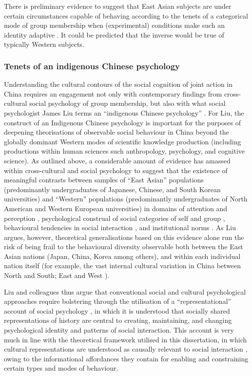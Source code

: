 \begin{CJK}{UTF8}{gbsn}
There is preliminary evidence to suggest that East Asian subjects are under certain circumstances capable of behaving according to the tenets of a categorical mode of group membership when (experimental) conditions make such an identity adaptive \citep{Hong2000}.  It could be predicted that the inverse would be true of typically Western subjects.




\subsubsection{Tenets of an indigenous Chinese psychology\label{sect:indigPsych}}
Understanding the cultural contours of the social cognition of joint action in China requires an engagement not only with contemporary findings from cross-cultural social psychology of group membership, but also with what social psychologist James Liu terms an ``indigenous Chinese psychology'' \citep{Liu2009}. For Liu, the construct of an Indigenous Chinese psychology is important for the purposes of deepening theorisations of observable social behaviour in China beyond the globally dominant Western modes of scientific knowledge production (including productions within human sciences such anthropology, psychology, and cognitive science).  As outlined above, a considerable amount of evidence has amassed within cross-cultural and social psychology to suggest that the existence of meaningful contrasts between samples of ``East Asian'' populations (predominantly undergraduates of Japanese, Chinese, and South Korean universities) and ``Western'' populations (predominantly undergraduates of North American and Western European universities) in domains of attention and perception \citep{Peng1997,Nisbett2003}, psychological construal of social categories of self and group \citep{Markus1991}, behavioural tendencies in social interaction \citep{Yuki2003}, and institutional norms \citep{Liu2017}.  As Liu argues, however, theoretical generalisations based on this evidence alone run the risk of being frail to the behavioural diversity observable both between the East Asian nations (Japan, China, Korea among others), and within each individual nation itself (for example, the vast internal cultural variation in China between North and South; East and West \citep[see, for example,][]{Henrich2014}).

Liu and colleagues thus argue that conventional social and cultural psychological approaches require bolstering through the utilisation of a ``representational'' account of social psychology \citep{Liu2005}, in which it is understood that socially shared representations of history are central to creating, maintaining, and changing psychological identity and patterns of social interaction.  This account is very much in line with the theoretical framework utilised in this dissertation, in which cultural representations are understood as causally relevant to social interaction \citep{Vesper2017}, owing to the informational affordances they contain for enabling and constraining certain types and modes of behaviour.



\end{CJK}
